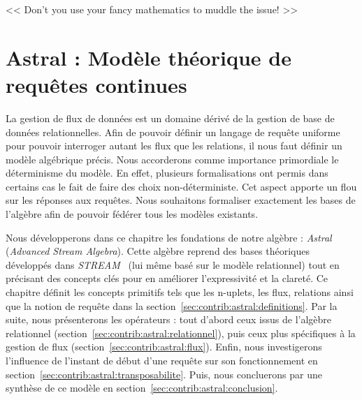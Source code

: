 \begin{savequote}[6cm]
<< Don't you use your fancy mathematics to muddle the issue! >>
\end{savequote}

\chapter{Astral : Modèle théorique de requêtes continues}
\chaptertoc

La gestion de flux de données est un domaine dérivé de la gestion de base de données relationnelles. Afin de pouvoir définir un langage de requête uniforme pour pouvoir interroger autant les flux que les relations, il nous faut définir un modèle algébrique précis. Nous accorderons comme importance primordiale le déterminisme du modèle. En effet, plusieurs formalisations ont permis dans certains cas le fait de faire des choix non-déterministe. Cet aspect apporte un flou sur les réponses aux requêtes. Nous souhaitons formaliser exactement les bases de l'algèbre afin de pouvoir fédérer tous les modèles existants.

Nous développerons dans ce chapitre les fondations de notre algèbre : \textit{Astral} (\textit{Advanced Stream Algebra}). Cette algèbre reprend des bases théoriques développés dans \textit{STREAM}~\cite{Arasu:stream} (lui même basé sur le modèle relationnel) tout en précisant des concepts clés pour en améliorer l'expressivité et la clareté. Ce chapitre définit les concepts primitifs tels que les n-uplets, les flux, relations ainsi que la notion de requête dans la section~\ref{sec:contrib:astral:definitions}. Par la suite, nous présenterons les opérateurs : tout d'abord ceux issus de l'algèbre relationnel (section~\ref{sec:contrib:astral:relationnel}), puis ceux plus spécifiques à la gestion de flux (section~\ref{sec:contrib:astral:flux}). Enfin, nous investigerons l'influence de l'instant de début d'une requête sur son fonctionnement en section~\ref{sec:contrib:astral:transposabilite}. Puis, nous concluerons par une synthèse de ce modèle en section~\ref{sec:contrib:astral:conclusion}.







